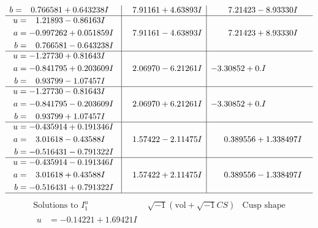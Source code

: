 \documentclass[1p]{elsarticle_modified}
\theoremstyle{definition}
\newcommand{\I}{\sqrt{-1}}
\begin{document}
$$\begin{array}{c|c|c}
\begin{aligned}
b &= \phantom{-}0.766581 + 0.643238 I\end{aligned}
 & \phantom{-}7.91161 + 4.63893 I & \phantom{-}7.21423 - 8.93330 I \\ \hline\begin{aligned}
u &= \phantom{-}1.21893 - 0.86163 I \\
a &= -0.997262 + 0.051859 I \\
b &= \phantom{-}0.766581 - 0.643238 I\end{aligned}
 & \phantom{-}7.91161 - 4.63893 I & \phantom{-}7.21423 + 8.93330 I \\ \hline\begin{aligned}
u &= -1.27730 + 0.81643 I \\
a &= -0.841795 + 0.203609 I \\
b &= \phantom{-}0.93799 - 1.07457 I\end{aligned}
 & \phantom{-}2.06970 - 6.21261 I & -3.30852 + 0. I\phantom{ +0.000000I} \\ \hline\begin{aligned}
u &= -1.27730 - 0.81643 I \\
a &= -0.841795 - 0.203609 I \\
b &= \phantom{-}0.93799 + 1.07457 I\end{aligned}
 & \phantom{-}2.06970 + 6.21261 I & -3.30852 + 0. I\phantom{ +0.000000I} \\ \hline\begin{aligned}
u &= -0.435914 + 0.191346 I \\
a &= \phantom{-}3.01618 - 0.43588 I \\
b &= -0.516431 - 0.791322 I\end{aligned}
 & \phantom{-}1.57422 - 2.11475 I & \phantom{-}0.389556 + 1.338497 I \\ \hline\begin{aligned}
u &= -0.435914 - 0.191346 I \\
a &= \phantom{-}3.01618 + 0.43588 I \\
b &= -0.516431 + 0.791322 I\end{aligned}
 & \phantom{-}1.57422 + 2.11475 I & \phantom{-}0.389556 - 1.338497 I\\
 \hline 
 \end{array}$$\newpage$$\begin{array}{c|c|c}  
\text{Solutions to }I^u_{1}& \I (\text{vol} + \sqrt{-1}CS) & \text{Cusp shape}\\
 \hline 
\begin{aligned}
u &= -0.14221 + 1.69421 I \\

\end{aligned}
\end{array}$$
\end{document}
